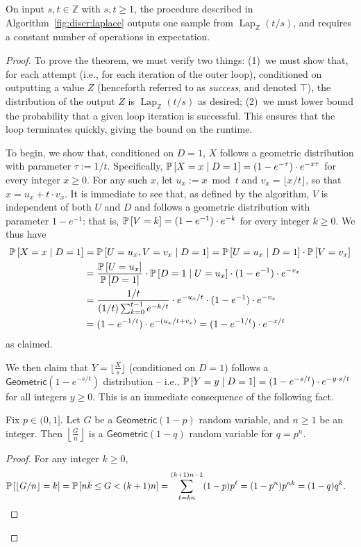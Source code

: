 \documentclass{jpc}
\newcommand{\discL}{\operatorname{Lap}_{\Z}} \newcommand{\discN}{\mathcal{N}_{\Z}}
\newcommand{\pr}[2]{{\ifx&#1& \mathbb{P} \else
\underset{#1}{\mathbb{P}} \fi \left[#2\right]}}
\newcommand{\eqdef}{:=}
\newcommand{\Z}{\mathbb{Z}}
\begin{document}
\begin{prop}
  \label{prop:sampling:discr:laplace}
  On input $s,t \in \Z$ with $s,t\ge1$, the procedure described in Algorithm~\ref{fig:discr:laplace} outputs one sample from $\discL(t/s)$, and requires a constant number of operations in expectation.
\end{prop}
\begin{proof}
To prove the theorem, we must verify two things: (1)~we must show that, for each attempt (i.e., for each iteration of the outer loop), conditioned on outputting a value $Z$ (henceforth referred to as \emph{success}, and denoted $\top$), the distribution of the output $Z$ is $\discL(t/s)$ as desired; (2)~we must lower bound the probability that a given loop iteration is successful. This ensures that the loop terminates quickly, giving the bound on the runtime.

To begin, we show that, conditioned on $D=1$, $X$ follows a geometric distribution with parameter $\tau\eqdef 1/t$. Specifically, $\pr{}{X=x \mid D=1}=(1-e^{-\tau}) \cdot e^{-x\tau}$ for every integer $x\geq 0$. For any such $x$, let $u_x \eqdef x\bmod t$ and $v_x = \lfloor x/t\rfloor$, so that $x=u_x + t\cdot v_x$. It is immediate to see that, as defined by the algorithm, $V$ is independent of both $U$ and $D$ and follows a geometric distribution with parameter $1-e^{-1}$: that is, $\pr{}{V=k} = (1-e^{-1}) \cdot e^{-k}$ for every integer $k\geq 0$. We thus have
\begin{align*}
  \pr{}{X=x \mid D=1} 
  &= \pr{}{ U = u_x, V = v_x \mid D=1}
  = \pr{}{ U = u_x \mid D=1 }\cdot\pr{}{ V = v_x }\\
  &= \frac{ \pr{}{U= u_x} }{\pr{}{D=1}}\cdot\pr{}{ D=1 \mid U=u_x } \cdot (1-e^{-1}) \cdot e^{-v_x} \\
  &= \frac{1/t}{(1/t)\sum_{k=0}^{t-1} e^{-k/t}}\cdot e^{- u_x/t}\cdot(1-e^{-1}) \cdot e^{-v_x} \\
  &= (1-e^{-1/t})\cdot e^{-(u_x/t+v_x)} 
  = (1-e^{-1/t})\cdot e^{-x/t} 
\end{align*}
as claimed.

We then claim that $Y = \lfloor\frac{X}{s}\rfloor$ (conditioned on $D=1$) follows a $\mathsf{Geometric}(1-e^{-s/t})$ distribution -- i.e., $\pr{}{Y=y \mid D=1} = (1-e^{-s/t}) \cdot e^{-y \cdot s/t}$ for all integers $y \ge 0$. This is an immediate consequence of the following fact.
\begin{fact}
Fix $p\in(0,1]$. Let $G$ be a $\mathsf{Geometric}(1-p)$ random variable, and $n\geq 1$ be an integer. Then $\left\lfloor\frac{G}{n}\right\rfloor$ is a $\mathsf{Geometric}(1-q)$ random variable for $q=p^n$.
\end{fact}
\begin{proof}
    For any integer $k\geq 0$, 
    \begin{align*}
        \pr{}{ \lfloor G/n\rfloor = k } 
        &= \pr{}{ nk \leq G < (k+1)n } 
        = \sum_{\ell=kn}^{(k+1)n-1} (1-p)p^\ell 
        = (1-p^n)p^{nk} = (1-q)q^k.
    \end{align*}
\end{proof}


\end{proof}
\end{document}
